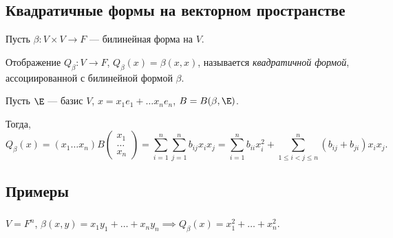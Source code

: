 \begin{comment}
    Матрица вида 
    $\begin{pmatrix}
        1 & \dots & \star \\
        \vdots & \ddots & \vdots \\
        0 & \dots & 1
    \end{pmatrix}$
    называется верхней унитреугольной
\end{comment}

\begin{comment}
    В доказательстве не использовалось свойство $1 + 1 \neq 0$, то есть свойство работает для любого поля.
\end{comment}


\subsection{Квадратичные формы на векторном пространстве}

Пусть $\beta \colon V \times V \to F$ --- билинейная форма на $V$.


\begin{definition}
    Отображение $Q_\beta \colon V \to F$, $Q_\beta(x) = \beta(x, x)$, называется \textit{квадратичной формой}, ассоциированной с билинейной формой $\beta$.
\end{definition}

Пусть $\E$ --- базис $V$, $x = x_1 e_1 + \dots x_n e_n$, $B = B(\beta, \E)$.

Тогда,
\begin{equation*}
    Q_\beta(x) = (x_1 \dots x_n) B \begin{pmatrix} x_1 \\ \dots \\ x_n \end{pmatrix} = \sum_{i = 1}^{n} \sum_{j = 1}^{n} b_{ij} x_i x_j = \sum_{i = 1}^{n} b_{ii} x_i^2 + \sum_{1 \leq i < j \leq n}^{n} (b_{ij} + b_{ji}) x_i x_j
.\end{equation*}


\subsection{Примеры}

\subsubsection{}

$V = F^n$, $\beta(x, y) = x_1 y_1 + \dots + x_n y_n \implies Q_\beta(x) = x_1^2 + \dots + x_n^2$.

